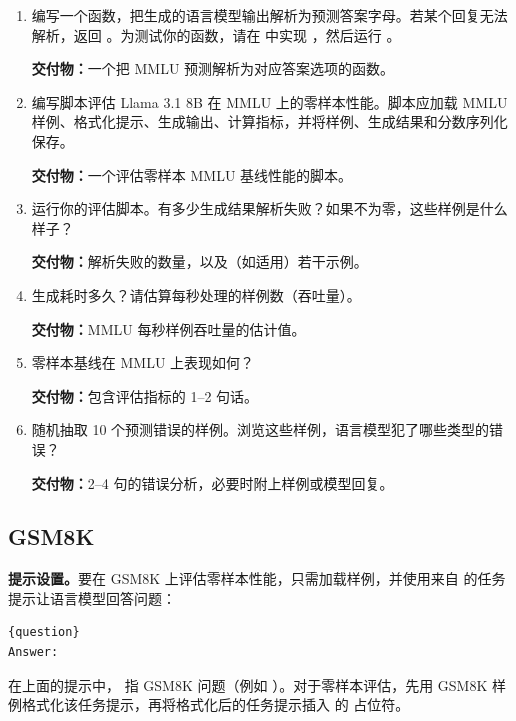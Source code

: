 \begin{enumerate}[label=(\alph*)]
  \item 编写一个函数，把生成的语言模型输出解析为预测答案字母。若某个回复无法解析，返回 。为测试你的函数，请在  中实现 ，然后运行 。

  \textbf{交付物：}一个把 MMLU 预测解析为对应答案选项的函数。
  \item 编写脚本评估 Llama 3.1 8B 在 MMLU 上的零样本性能。脚本应加载 MMLU 样例、格式化提示、生成输出、计算指标，并将样例、生成结果和分数序列化保存。

  \textbf{交付物：}一个评估零样本 MMLU 基线性能的脚本。
  \item 运行你的评估脚本。有多少生成结果解析失败？如果不为零，这些样例是什么样子？

  \textbf{交付物：}解析失败的数量，以及（如适用）若干示例。
  \item 生成耗时多久？请估算每秒处理的样例数（吞吐量）。

  \textbf{交付物：}MMLU 每秒样例吞吐量的估计值。
  \item 零样本基线在 MMLU 上表现如何？

  \textbf{交付物：}包含评估指标的 1--2 句话。
  \item 随机抽取 10 个预测错误的样例。浏览这些样例，语言模型犯了哪些类型的错误？

  \textbf{交付物：}2--4 句的错误分析，必要时附上样例或模型回复。
\end{enumerate}

\subsection{GSM8K}

\textbf{提示设置。}要在 GSM8K 上评估零样本性能，只需加载样例，并使用来自  的任务提示让语言模型回答问题：

\begin{lstlisting}
{question}
Answer:
\end{lstlisting}

在上面的提示中， 指 GSM8K 问题（例如 ）。对于零样本评估，先用 GSM8K 样例格式化该任务提示，再将格式化后的任务提示插入  的  占位符。

